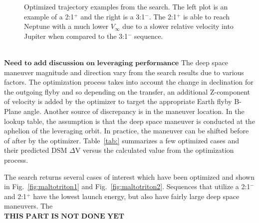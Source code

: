 \documentclass[letterpaper, paper,11pt]{./AAS}		%
\begin{document}
\begin{figure}[ht]
\begin{minipage}{0.50\textwidth}
		\end{minipage}
		\caption{Optimized trajectory examples from the search. The left plot is an example of a 2:1$^{+}$ and the right is a 3:1$^{-}$. The 2:1$^{+}$ is able to reach Neptune with a much lower $V_\infty$ due to a slower relative velocity into Jupiter when compared to the 3:1$^{-}$ sequence.}
		\label{fig:maltotriton}
\end{figure}
%
%
\\$\textbf{Need to add discussion on leveraging performance}$
The deep space maneuver magnitude and direction vary from the search results due to various factors. The optimization process takes into account the change in declination for the outgoing flyby and so depending on the transfer, an additional Z-component of velocity is added by the optimizer to target the appropriate Earth flyby B-Plane angle. Another source of discrepancy is in the maneuver location. In the lookup table, the assumption is that the deep space maneuver is conducted at the aphelion of the leveraging orbit. In practice, the maneuver can be shifted before of after by the optimizer. Table~\ref{tab:} summarizes a few optimized cases and their predicted DSM $\Delta$V versus the calculated value from the optimization process.


The search returns several cases of interest which have been optimized and shown in Fig.~\ref{fig:maltotriton1} and Fig.~\ref{fig:maltotriton2}. Sequences that utilize a 2:1$^{-}$ and 2:1$^{+}$ have the lowest launch energy, but also have fairly large deep space maneuvers. The
\\$\textbf{THIS PART IS NOT DONE YET}$


\phantom{p. 1}
\clearpage


\end{document}

